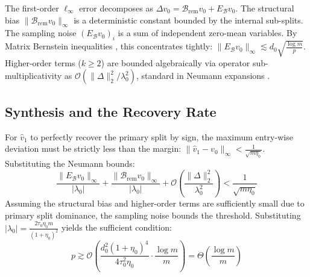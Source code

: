 The first-order $\ell_\infty$ error decomposes as $\Delta v_0 = \mathcal{B}_{\text{rem}} v_0 + E_{\mathcal{B}} v_0$.
The structural bias $\|\mathcal{B}_{\text{rem}} v_0\|_\infty$ is a deterministic constant bounded by the internal sub-splits. The sampling noise $(E_{\mathcal{B}} v_0)_i$ is a sum of independent zero-mean variables. By Matrix Bernstein inequalities \cite{tropp2012userfriendly}, this concentrates tightly: $\|E_{\mathcal{B}} v_0\|_\infty \lesssim d_0 \sqrt{\frac{\log m}{p}}$. 
Higher-order terms ($k \ge 2$) are bounded algebraically via operator sub-multiplicativity as $\mathcal{O}(\|\Delta\|_2^2 / \lambda_0^2)$, standard in Neumann expansions \cite{abbe2020entrywise}.

\subsection{Synthesis and the Recovery Rate}

For $\hat{v}_1$ to perfectly recover the primary split by sign, the maximum entry-wise deviation must be strictly less than the margin: $\|\hat{v}_1 - v_0\|_\infty < \frac{1}{\sqrt{m \eta_0}}$. Substituting the Neumann bounds:
\begin{equation}
\frac{\|E_{\mathcal{B}} v_0\|_\infty}{|\lambda_0|} + \frac{\|\mathcal{B}_{\text{rem}} v_0\|_\infty}{|\lambda_0|} + \mathcal{O}\left( \frac{\|\Delta\|_2^2}{\lambda_0^2} \right) < \frac{1}{\sqrt{m \eta_0}}
\end{equation}
Assuming the structural bias and higher-order terms are sufficiently small due to primary split dominance, the sampling noise bounds the threshold. Substituting $|\lambda_0| = \frac{2 \tau_0 \eta_0 m}{(1+\eta_0)^2}$ yields the sufficient condition:
\begin{equation}
p \gtrsim \mathcal{O}\left( \frac{d_0^2 (1+\eta_0)^4}{4 \tau_0^2 \eta_0} \cdot \frac{\log m}{m} \right) = \Theta\left(\frac{\log m}{m}\right)
\end{equation}
